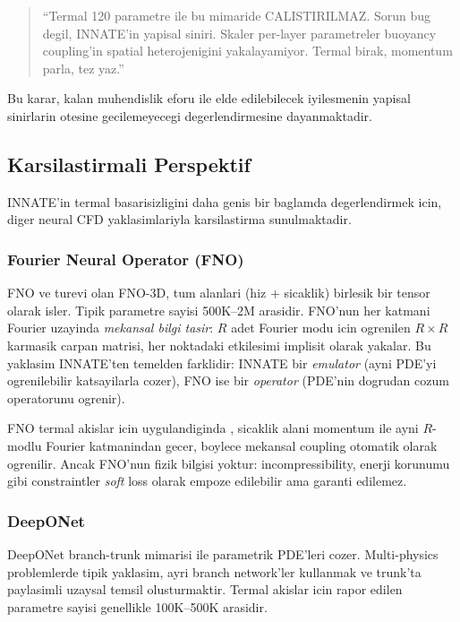 \begin{quote}
  ``Termal 120 parametre ile bu mimaride CALISTIRILMAZ. Sorun bug degil,
  INNATE'in yapisal siniri. Skaler per-layer parametreler buoyancy coupling'in
  spatial heterojenigini yakalayamiyor. Termal birak, momentum parla, tez yaz.''
\end{quote}

Bu karar, kalan muhendislik eforu ile elde edilebilecek iyilesmenin
yapisal sinirlarin otesine gecilemeyecegi degerlendirmesine dayanmaktadir.


\subsection{Karsilastirmali Perspektif}
\label{sec:comparative}

INNATE'in termal basarisizligini daha genis bir baglamda
degerlendirmek icin, diger neural CFD yaklasimlariyla karsilastirma
sunulmaktadir.


\subsubsection{Fourier Neural Operator (FNO)}

FNO \cite{li2021fno} ve turevi olan FNO-3D, tum alanlari (hiz + sicaklik)
birlesik bir tensor olarak isler. Tipik parametre sayisi 500K--2M arasidir.
FNO'nun her katmani Fourier uzayinda \emph{mekansal bilgi tasir}: $R$ adet
Fourier modu icin ogrenilen $R \times R$ karmasik carpan matrisi, her noktadaki
etkilesimi implisit olarak yakalar. Bu yaklasim INNATE'ten temelden farklidir:
INNATE bir \emph{emulator} (ayni PDE'yi ogrenilebilir katsayilarla cozer),
FNO ise bir \emph{operator} (PDE'nin dogrudan cozum operatorunu ogrenir).

FNO termal akislar icin uygulandiginda \cite{li2024geometry}, sicaklik alani
momentum ile ayni $R$-modlu Fourier katmanindan gecer, boylece mekansal
coupling otomatik olarak ogrenilir. Ancak FNO'nun fizik bilgisi yoktur:
incompressibility, enerji korunumu gibi constraintler \emph{soft} loss olarak
empoze edilebilir ama garanti edilemez.


\subsubsection{DeepONet}

DeepONet \cite{lu2021deeponet} branch-trunk mimarisi ile parametrik PDE'leri
cozer. Multi-physics problemlerde tipik yaklasim, ayri branch network'ler
kullanmak ve trunk'ta paylasimli uzaysal temsil olusturmaktir. Termal
akislar icin rapor edilen parametre sayisi genellikle 100K--500K arasidir.

